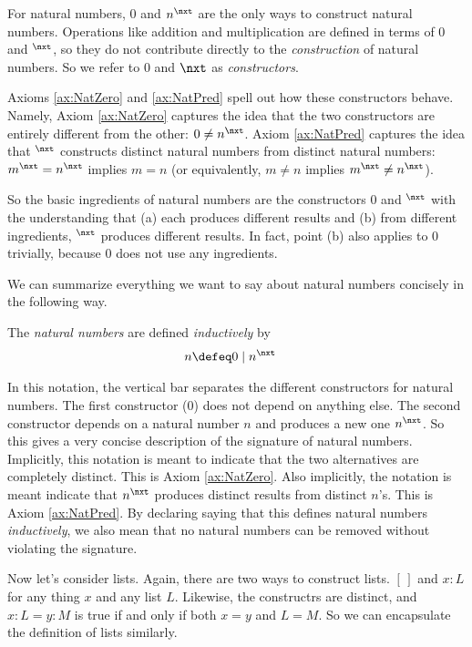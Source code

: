 For natural numbers, $0$ and $n^\nxt$ are the only ways to construct
natural numbers. Operations like addition and multiplication are
defined in terms of $0$ and ${}^\nxt$, so they do not contribute directly
to the \emph{construction} of natural numbers. So
we refer to $0$ and $\nxt$ as \emph{constructors}.  

Axioms \ref{ax:NatZero} and \ref{ax:NatPred} spell out how these
constructors behave.  Namely, Axiom \ref{ax:NatZero} captures the idea that
the two constructors are entirely different from the other: $0\neq n^\nxt$.
Axiom \ref{ax:NatPred} captures the idea that ${}^\nxt$ constructs
distinct natural numbers from distinct natural numbers: $m^\nxt =
n^\nxt$ implies $m=n$ (or equivalently, $m\neq n$ implies $m^\nxt\neq n^\nxt$).

So the basic ingredients of natural numbers are the constructors $0$
and ${}^\nxt$ with the understanding that (a) each produces
different results and (b) from different ingredients, ${}^\nxt$
produces different results. In fact, point (b) also applies to $0$
trivially, because $0$ does not use any ingredients.

We can summarize everything we want to say about natural numbers
concisely in the following way.

\begin{defn}
  The \emph{natural numbers} are defined \emph{inductively} by
  \begin{align*}
    n &\defeq 0 \mathrel{\mid} n^\nxt
  \end{align*}
\end{defn}

In this notation, the vertical bar separates the different constructors for
natural numbers.  The first constructor ($0$) does not depend on
anything else. The second constructor depends on a natural number $n$
and produces a new one $n^\nxt$. So this gives a very concise description of the signature of natural numbers.
Implicitly, this notation is meant to
indicate that the two alternatives are completely distinct. This is
Axiom \ref{ax:NatZero}.  Also implicitly, the notation is meant indicate that $n^\nxt$
produces distinct results from distinct $n$'s.  This is Axiom
\ref{ax:NatPred}.  By declaring saying that this defines natural numbers
\emph{inductively}, we also mean that no natural numbers can be removed without violating
the signature.

Now let's consider lists. Again, there are two ways to construct lists. $[\,]$ and $x:L$ for any thing $x$
and any list $L$. Likewise, the constructrs are distinct, and $x:L=y:M$ is true if and only if
both $x=y$ and $L=M$. So we can encapsulate the definition of lists similarly.

